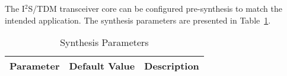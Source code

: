 
The I$^2$S/TDM transceiver core can be configured pre-synthesis to match the
intended application. The synthesis parameters are presented in
Table~\ref{tab:sp}.

\begin{table}[H]
  \centering
    \begin{tabularx}{\textwidth}{ | c | c | X | }
    \hline
    \rowcolor{iob-green}
    {\bf Parameter} & {\bf Default Value} & {\bf Description} \\\hline

    

    \end{tabularx}
  \caption{Synthesis Parameters}
  \label{tab:sp}
\end{table}
